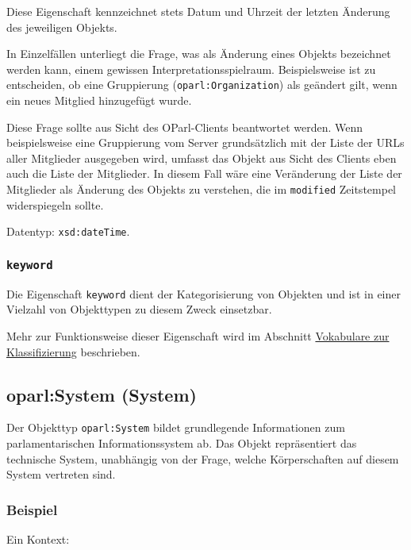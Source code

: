 \documentclass[,a4paper]{article}
\begin{document}
Diese Eigenschaft kennzeichnet stets Datum und Uhrzeit der letzten
Änderung des jeweiligen Objekts.

In Einzelfällen unterliegt die Frage, was als Änderung eines Objekts
bezeichnet werden kann, einem gewissen Interpretationsspielraum.
Beispielsweise ist zu entscheiden, ob eine Gruppierung
(\texttt{oparl:Organization}) als geändert gilt, wenn ein neues Mitglied
hinzugefügt wurde.

Diese Frage sollte aus Sicht des OParl-Clients beantwortet werden. Wenn
beispielsweise eine Gruppierung vom Server grundsätzlich mit der Liste
der URLs aller Mitglieder ausgegeben wird, umfasst das Objekt aus Sicht
des Clients eben auch die Liste der Mitglieder. In diesem Fall wäre eine
Veränderung der Liste der Mitglieder als Änderung des Objekts zu
verstehen, die im \texttt{modified} Zeitstempel widerspiegeln sollte.

Datentyp: \texttt{xsd:dateTime}.

\subsubsection{\texttt{keyword}}\label{keyword}

Die Eigenschaft \texttt{keyword} dient der Kategorisierung von Objekten
und ist in einer Vielzahl von Objekttypen zu diesem Zweck einsetzbar.

Mehr zur Funktionsweise dieser Eigenschaft wird im Abschnitt
\hyperref[vokabulareux5fklassifizierung]{Vokabulare zur Klassifizierung}
beschrieben.

\subsection{oparl:System (System)}\label{oparlux5fsystem}

Der Objekttyp \texttt{oparl:System} bildet grundlegende Informationen
zum parlamentarischen Informationssystem ab. Das Objekt repräsentiert
das technische System, unabhängig von der Frage, welche Körperschaften
auf diesem System vertreten sind.

\subsubsection{Beispiel}\label{beispiel}

Ein Kontext:
\end{document}
